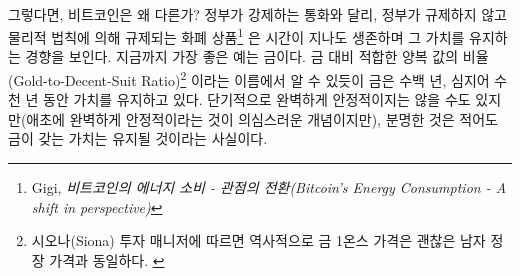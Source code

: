
\paragraph{}
그렇다면, 비트코인은 왜 다른가? 정부가 강제하는 통화와 달리, 
정부가 규제하지 않고 물리적 법칙에 의해 규제되는 화폐 상품\footnote{Gigi, 
	\textit{비트코인의 에너지 소비 - 관점의 전환(Bitcoin's Energy Consumption - A shift in perspective)}\cite{gigi:energy}}
은 시간이 지나도 생존하며 그 가치를 유지하는 경향을 보인다. 지금까지 가장 좋은 예는 금이다. 
금 대비 적합한 양복 값의 비율(Gold-to-Decent-Suit Ratio)\footnote{시오나(Siona) 
	투자 매니저에 따르면 역사적으로 금 1온스 가격은 괜찮은 남자 정장 가격과 동일하다. \cite{web:gold-to-decent-suite-ratio}}
이라는 이름에서 알 수 있듯이 금은 수백 년, 심지어 수천 년 동안 가치를 유지하고 있다. 
단기적으로 완벽하게 안정적이지는 않을 수도 있지만(애초에 완벽하게 안정적이라는 것이 의심스러운 개념이지만),
분명한 것은 적어도 금이 갖는 가치는 유지될 것이라는 사실이다.




